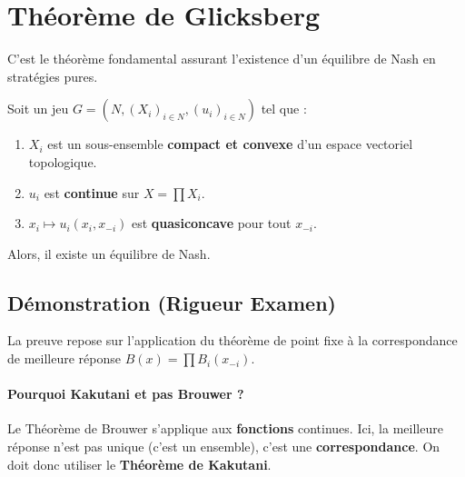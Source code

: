 \section{Théorème de Glicksberg}
C'est le théorème fondamental assurant l'existence d'un équilibre de Nash en stratégies pures.

\begin{theoreme}[Glicksberg]
Soit un jeu $G = (N, (X_i)_{i \in N}, (u_i)_{i \in N})$ tel que :
\begin{enumerate}
    \item $X_i$ est un sous-ensemble \textbf{compact et convexe} d'un espace vectoriel topologique.
    \item $u_i$ est \textbf{continue} sur $X = \prod X_i$.
    \item $x_i \mapsto u_i(x_i, x_{-i})$ est \textbf{quasiconcave} pour tout $x_{-i}$.
\end{enumerate}
Alors, il existe un équilibre de Nash.
\end{theoreme}

\subsection{Démonstration (Rigueur Examen)}
La preuve repose sur l'application du théorème de point fixe à la correspondance de meilleure réponse $B(x) = \prod B_i(x_{-i})$.

\paragraph{Pourquoi Kakutani et pas Brouwer ?}
Le Théorème de Brouwer s'applique aux \textbf{fonctions} continues. Ici, la meilleure réponse n'est pas unique (c'est un ensemble), c'est une \textbf{correspondance}. On doit donc utiliser le \textbf{Théorème de Kakutani}.

